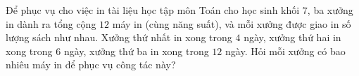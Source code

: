 \begin{vn}
Để phục vụ cho việc in tài liệu học tập môn Toán cho học sinh khối $ 7 $, ba xưởng in dành ra tổng cộng $ 12 $ máy in (cùng năng suất), và mỗi xưởng được giao in số lượng sách như nhau. Xưởng thứ nhất in xong trong $ 4 $ ngày, xưởng thứ hai in xong trong $ 6 $ ngày, xưởng thứ ba in xong trong $ 12 $ ngày. Hỏi mỗi xưởng có bao nhiêu máy in để phục vụ công tác này?
\end{vn}
